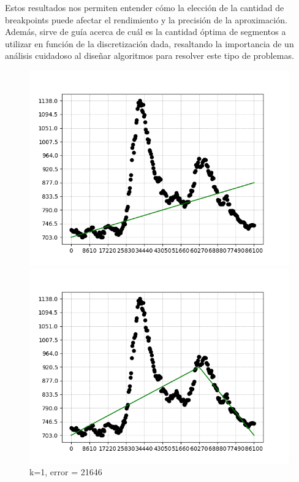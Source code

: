 \documentclass{article}
\begin{document}
    Estos resultados nos permiten entender cómo la elección de la cantidad de breakpoints puede afectar el rendimiento y la precisión de la aproximación. Además, sirve de guía acerca de cuál es la cantidad óptima de segmentos a utilizar en función de la discretización dada, resaltando la importancia de un análisis cuidadoso al diseñar algoritmos para resolver este tipo de problemas.                                                                                              

   
    
\begin{figure}[ht]
    \centering
    \begin{minipage}{.3\textwidth}
        \centering
        \includegraphics[width=.9\linewidth]{graficos/solution_11x11,1N_optimistic_instance.png}
        \caption{k=1, error = 21646}
    \end{minipage}%
    \begin{minipage}{.3\textwidth}
        \centering
        \includegraphics[width=.9\linewidth]{graficos/solution_11x11,2N_optimistic_instance.png}

\end{minipage}
\end{figure}
\end{document}
